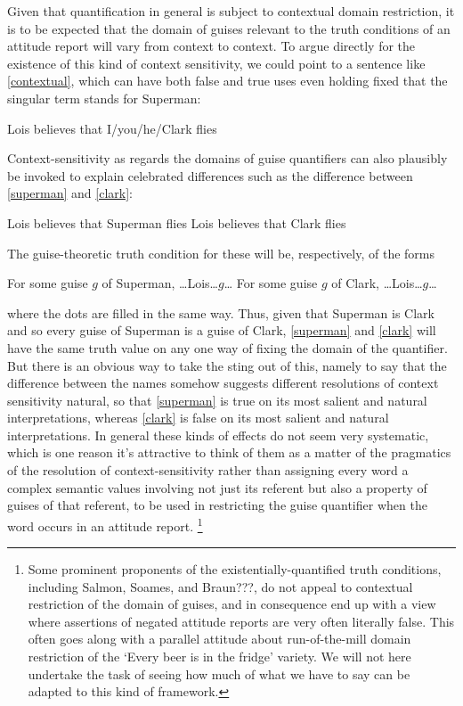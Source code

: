 \documentclass[If.tex]{subfiles}
\begin{document}
Given that quantification in general is subject to contextual domain restriction, it is to be expected that the domain of guises relevant to the truth conditions of an attitude report will vary from context to context.  To argue directly for the existence of this kind of context sensitivity, we could point to a sentence like \ref{contextual}, which can have both false and true uses even holding fixed that the singular term stands for Superman:
\begin{prop}
    \nitem \label{contextual}
    Lois believes that I/you/he/Clark flies
\end{prop}
Context-sensitivity as regards the domains of guise quantifiers can also plausibly be invoked to explain celebrated differences such as the difference between \ref{superman} and \ref{clark}:
\begin{prop}
    \nitem \label{superman}
    Lois believes that Superman flies
    \nitem \label{clark}
    Lois believes that Clark flies
\end{prop}
The guise-theoretic truth condition for these will be, respectively, of the forms
\begin{prop}
    \nitem \label{superman}
    For some guise $g$ of Superman, …Lois…$g$…
    \nitem \label{clark}
    For some guise $g$ of Clark, …Lois…$g$…
\end{prop}
where the dots are filled in the same way.  Thus, given that Superman is Clark and so every guise of Superman is a guise of Clark, \ref{superman} and \ref{clark} will have the same truth value on any one way of fixing the domain of the quantifier.  But there is an obvious way to take the sting out of this, namely to say that the difference between the names somehow suggests different resolutions of context sensitivity natural, so that \ref{superman} is true on its most salient and natural interpretations, whereas \ref{clark} is false on its most salient and natural interpretations.  In general these kinds of effects do not seem very systematic, which is one reason it's attractive to think of them as a matter of the pragmatics of the resolution of context-sensitivity rather than assigning every word a complex semantic values involving not just its referent but also a property of guises of that referent, to be used in restricting the guise quantifier when the word occurs in an attitude report.%
\footnote{Some prominent proponents of the existentially-quantified truth conditions, including Salmon, Soames, and Braun???, do not appeal to contextual restriction of the domain of guises, and in consequence end up with a view where assertions of negated attitude reports are very often literally false.  This often goes along with a parallel attitude about run-of-the-mill domain restriction of the ‘Every beer is in the fridge’ variety.  We will not here undertake the task of seeing how much of what we have to say can be adapted to this kind of framework.}
\end{document}
